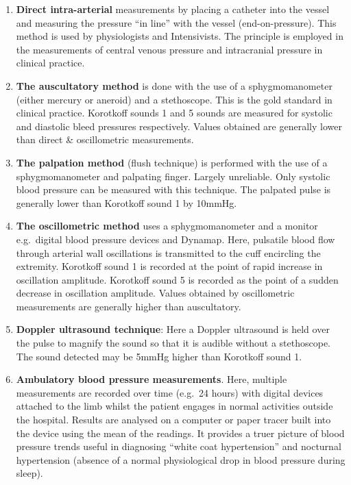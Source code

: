 \documentclass[
  letterpaper,
  DIV=11,
  numbers=noendperiod]{scrreprt}
\providecommand{\tightlist}{%
  \setlength{\itemsep}{0pt}\setlength{\parskip}{0pt}}\usepackage{longtable,booktabs,array}
\begin{document}
\begin{enumerate}
\def\labelenumi{\arabic{enumi}.}
\tightlist
\item
  \textbf{Direct intra-arterial} measurements by placing a catheter into
  the vessel and measuring the pressure ``in line'' with the vessel
  (end-on-pressure). This method is used by physiologists and
  Intensivists. The principle is employed in the measurements of central
  venous pressure and intracranial pressure in clinical practice.
\item
  \textbf{The auscultatory method} is done with the use of a
  sphygmomanometer (either mercury or aneroid) and a stethoscope. This
  is the gold standard in clinical practice. Korotkoff sounds 1 and 5
  sounds are measured for systolic and diastolic bleed pressures
  respectively. Values obtained are generally lower than direct \&
  oscillometric measurements.
\item
  \textbf{The palpation method} (flush technique) is performed with the
  use of a sphygmomanometer and palpating finger. Largely unreliable.
  Only systolic blood pressure can be measured with this technique. The
  palpated pulse is generally lower than Korotkoff sound 1 by 10mmHg.
\item
  \textbf{The oscillometric method} uses a sphygmomanometer and a
  monitor e.g.~digital blood pressure devices and Dynamap. Here,
  pulsatile blood flow through arterial wall oscillations is transmitted
  to the cuff encircling the extremity. Korotkoff sound 1 is recorded at
  the point of rapid increase in oscillation amplitude. Korotkoff sound
  5 is recorded as the point of a sudden decrease in oscillation
  amplitude. Values obtained by oscillometric measurements are generally
  higher than auscultatory.
\item
  \textbf{Doppler ultrasound technique}: Here a Doppler ultrasound is
  held over the pulse to magnify the sound so that it is audible without
  a stethoscope. The sound detected may be 5mmHg higher than Korotkoff
  sound 1.
\item
  \textbf{Ambulatory blood pressure measurements}. Here, multiple
  measurements are recorded over time (e.g.~24 hours) with digital
  devices attached to the limb whilst the patient engages in normal
  activities outside the hospital. Results are analysed on a computer or
  paper tracer built into the device using the mean of the readings. It
  provides a truer picture of blood pressure trends useful in diagnosing
  ``white coat hypertension'' and nocturnal hypertension (absence of a
  normal physiological drop in blood pressure during sleep).
\end{enumerate}
\end{document}
